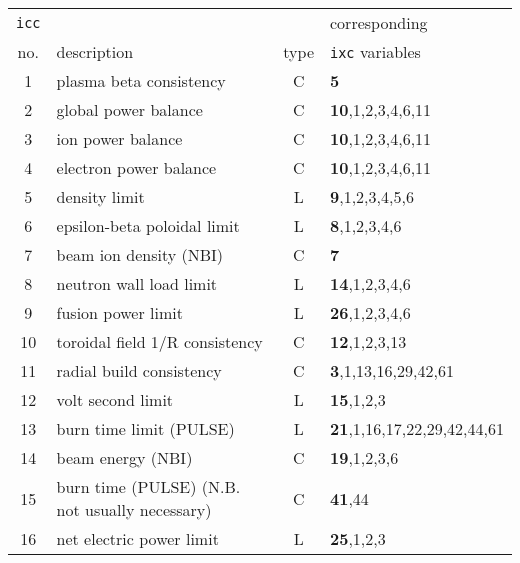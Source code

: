 \documentclass[11pt,a4paper]{report}
\begin{document}
\begin{table}[tbph]
\footnotesize
\begin{center}

\begin{tabular}{||c|l|c|l||} \hline
\texttt{icc} &                                            &      & corresponding \\
no. & description                                         & type & \texttt{ixc} variables \\ \hline
1   & plasma beta consistency                             & C    & \textbf{5} \\
2   & global power balance                                & C    & \textbf{10},1,2,3,4,6,11 \\
3   & ion power balance                                   & C    & \textbf{10},1,2,3,4,6,11 \\
4   & electron power balance                              & C    & \textbf{10},1,2,3,4,6,11 \\
5   & density limit                                       & L    & \textbf{9},1,2,3,4,5,6 \\
6   & epsilon-beta poloidal limit                         & L    & \textbf{8},1,2,3,4,6 \\
7   & beam ion density (NBI)                              & C    & \textbf{7} \\
8   & neutron wall load limit                             & L    & \textbf{14},1,2,3,4,6 \\
9   & fusion power limit                                  & L    & \textbf{26},1,2,3,4,6 \\
10  & toroidal field 1/R consistency                      & C    & \textbf{12},1,2,3,13 \\
11  & radial build consistency                            & C    & \textbf{3},1,13,16,29,42,61 \\
12  & volt second limit                                   & L    & \textbf{15},1,2,3 \\
13  & burn time limit (PULSE)                             & L    & \textbf{21},1,16,17,22,29,42,44,61 \\
14  & beam energy (NBI)                                   & C    & \textbf{19},1,2,3,6 \\
15  & burn time (PULSE) (N.B. not usually necessary)      & C    & \textbf{41},44 \\
16  & net electric power limit                            & L    & \textbf{25},1,2,3 \\

\end{tabular}
\end{center}
\end{table}
\end{document}

